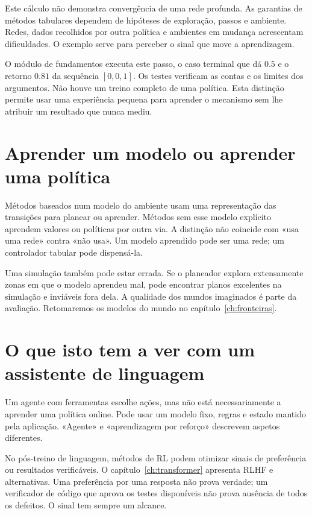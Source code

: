 Este cálculo não demonstra convergência de uma rede profunda. As garantias de métodos tabulares dependem de hipóteses de exploração, passos e ambiente. Redes, dados recolhidos por outra política e ambientes em mudança acrescentam dificuldades. O exemplo serve para perceber o sinal que move a aprendizagem.

O módulo de fundamentos executa este passo, o caso terminal que dá $0.5$ e o retorno $0.81$ da sequência $[0,0,1]$. Os testes verificam as contas e os limites dos argumentos. Não houve um treino completo de uma política. Esta distinção permite usar uma experiência pequena para aprender o mecanismo sem lhe atribuir um resultado que nunca mediu.

\section{Aprender um modelo ou aprender uma política}
Métodos baseados num modelo do ambiente usam uma representação das transições para planear ou aprender. Métodos sem esse modelo explícito aprendem valores ou políticas por outra via. A distinção não coincide com «usa uma rede» contra «não usa». Um modelo aprendido pode ser uma rede; um controlador tabular pode dispensá-la.

Uma simulação também pode estar errada. Se o planeador explora extensamente zonas em que o modelo aprendeu mal, pode encontrar planos excelentes na simulação e inviáveis fora dela. A qualidade dos mundos imaginados é parte da avaliação. Retomaremos os modelos do mundo no capítulo~\ref{ch:fronteiras}.

\section{O que isto tem a ver com um assistente de linguagem}
Um agente com ferramentas escolhe ações, mas não está necessariamente a aprender uma política online. Pode usar um modelo fixo, regras e estado mantido pela aplicação. «Agente» e «aprendizagem por reforço» descrevem aspetos diferentes.

No pós-treino de linguagem, métodos de RL podem otimizar sinais de preferência ou resultados verificáveis. O capítulo~\ref{ch:transformer} apresenta RLHF e alternativas. Uma preferência por uma resposta não prova verdade; um verificador de código que aprova os testes disponíveis não prova ausência de todos os defeitos. O sinal tem sempre um alcance.

